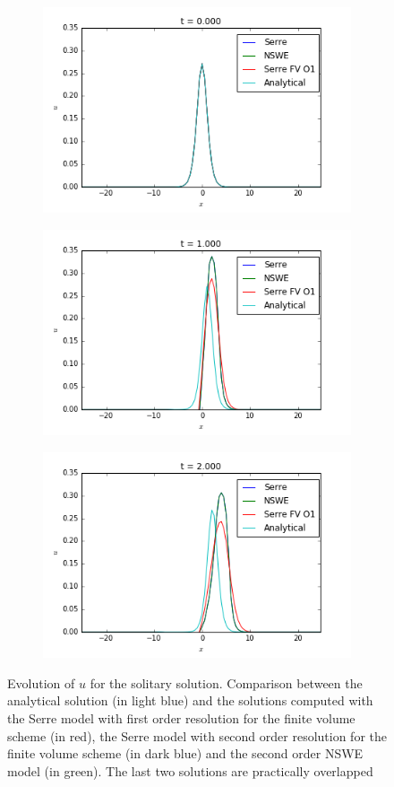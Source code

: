 \begin{figure}[h!]
	\begin{subfigure}{.3\linewidth}
		\includegraphics[scale=.3]{figures/Serre/solitary1u.png}	
	\end{subfigure}
	\begin{subfigure}{.3\linewidth}
		\includegraphics[scale=.3]{figures/Serre/solitary2u.png}	
	\end{subfigure}
	\begin{subfigure}{.3\linewidth}
		\includegraphics[scale=.3]{figures/Serre/solitary3u.png}	
	\end{subfigure}
	\caption{Evolution of $u$ for the solitary solution. Comparison between the analytical solution (in light blue) and the solutions computed with the Serre model with first order resolution for the finite volume scheme (in red), the Serre model with second order resolution for the finite volume scheme (in dark blue)  and the second order NSWE model (in green). The last two solutions are practically overlapped \label{fig:solitaryu}}
\end{figure}

